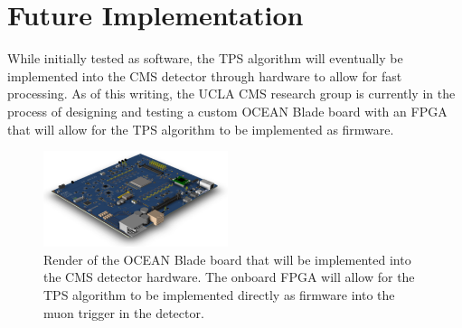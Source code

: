 \section{Future Implementation}
\label{subsec:TPSResults}

While initially tested as software, the TPS algorithm will eventually be implemented into the CMS detector through hardware to allow for fast processing.
As of this writing, the UCLA CMS research group is currently in the process of designing and testing a custom OCEAN Blade board with an FPGA that will allow for the TPS algorithm to be implemented as firmware.

\begin{figure}[htbp] %
  \centering
  \includegraphics[width=0.48\textwidth]{fig/TPS/ocean.pdf}
  \caption{Render of the OCEAN Blade board that will be implemented into the CMS detector hardware. The onboard FPGA will allow for the TPS algorithm to be implemented directly as firmware into the muon trigger in the detector.}
  \label{fig:ocean}
\end{figure}
